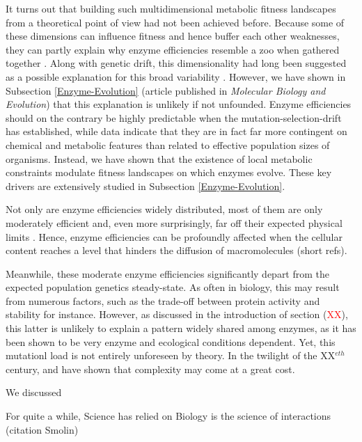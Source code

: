 It turns out that building such multidimensional metabolic fitness landscapes from a theoretical point of view had not been achieved before. Because some of these dimensions can influence fitness and hence buffer each other weaknesses, they can partly explain why enzyme efficiencies resemble a zoo when gathered together \citep{Bar-Even11}. Along with genetic drift, this dimensionality had long been suggested as a possible explanation for this broad variability \citep{Hartl85,Clark91}. However, we have shown in Subsection \ref{Enzyme-Evolution} (article published in \textit{Molecular Biology and Evolution}) that this explanation is unlikely if not unfounded. Enzyme efficiencies should on the contrary be highly predictable when the mutation-selection-drift has established, while data indicate that they are in fact far more contingent on chemical and metabolic features than related to effective population sizes of organisms. Instead, we have shown that the existence of local metabolic constraints modulate fitness landscapes on which enzymes evolve. These key drivers are extensively studied in Subsection \ref{Enzyme-Evolution}.

Not only are enzyme efficiencies widely distributed, most of them are only moderately efficient and, even more surprisingly, far off their expected physical limits \citep{Bar-Even11,Bar-Even15}. Hence, enzyme efficiencies can be profoundly affected when the cellular content reaches a level that hinders the diffusion of macromolecules (short refs). 

Meanwhile, these moderate enzyme efficiencies significantly depart from the expected population genetics steady-state. As often in biology, this may result from numerous factors, such as the trade-off between protein activity and stability for instance. However, as discussed in the introduction of section (\textcolor{red}{XX}), this latter is unlikely to explain a pattern widely shared among enzymes, as it has been shown to be very enzyme and ecological conditions dependent. Yet, this mutationl load is not entirely unforeseen by theory. In the twilight of the XX$^{eth}$ century, \citet{Hartl96} and \citet{Poon00} have shown that complexity may come at a great cost. 

We discussed 

For quite a while, Science has relied on 
Biology is the science of interactions (citation Smolin)
